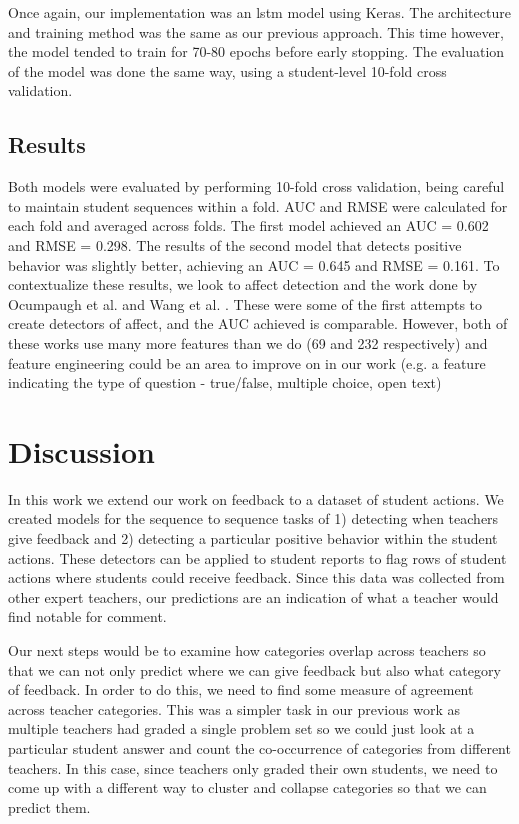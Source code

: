\documentclass[12pt]{report}
\begin{document}
Once again, our implementation was an lstm model using Keras. The architecture and training method was the same as our previous approach. This time however, the model tended to train for 70-80 epochs before early stopping. The evaluation of the model was done the same way, using a student-level 10-fold cross validation.


\section{Results}

Both models were evaluated by performing 10-fold cross validation, being careful to maintain student sequences within a fold. AUC and RMSE were calculated for each fold and averaged across folds. The first model achieved an AUC = 0.602 and RMSE = 0.298. The results of the second model that detects positive behavior was slightly better, achieving an AUC = 0.645 and RMSE = 0.161. To contextualize these results, we look to affect detection and the work done by Ocumpaugh et al. \cite{affect_detection} and Wang et al. \cite{Wang2015TowardsBA}. These were some of the first attempts to create detectors of affect, and the AUC achieved is comparable. However, both of these works use many more features than we do (69 and 232 respectively) and feature engineering could be an area to improve on in our work (e.g. a feature indicating the type of question - true/false, multiple choice, open text)

\chapter{Discussion}

In this work we extend our work on feedback to a dataset of student actions. We created models for the sequence to sequence tasks of 1) detecting when teachers give feedback and 2) detecting a particular positive behavior within the student actions. These detectors can be applied to student reports to flag rows of student actions where students could receive feedback. Since this data was collected from other expert teachers, our predictions are an indication of what a teacher would find notable for comment.

Our next steps would be to examine how categories overlap across teachers so that we can not only predict where we can give feedback but also what category of feedback. In order to do this, we need to find some measure of agreement across teacher categories. This was a simpler task in our previous work as multiple teachers had graded a single problem set so we could just look at a particular student answer and count the co-occurrence of categories from different teachers. In this case, since teachers only graded their own students, we need to come up with a different way to cluster and collapse categories so that we can predict them.
\end{document}
